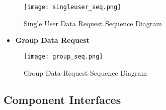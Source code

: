 \FloatBarrier
\begin{figure}[!h]
	\centering
	\texttt{[image: singleuser\_seq.png]}
	\caption{Single User Data Request Sequence Diagram}
\end{figure}
\FloatBarrier

\begin{itemize}
	\item \textbf{Group Data Request}
\end{itemize}

\FloatBarrier
\begin{figure}[!h]
	\centering
	\texttt{[image: group\_seq.png]}
	\caption{Group Data Request Sequence Diagram}
\end{figure}
\FloatBarrier


\subsection{Component Interfaces}

